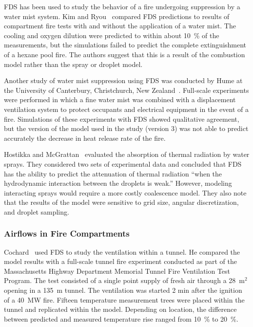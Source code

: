 FDS  has  been  used  to  study  the behavior  of  a  fire  undergoing suppression     by     a    water     mist     system.     Kim     and
Ryou~\cite{Kim:BE2003,Kim:IJACR2004}   compared  FDS   predictions  to results of compartment fire tests  with and without the application of a water
mist. The cooling and oxygen dilution were predicted to within about 10~\% of the measurements, but the simulations failed to predict the complete
extinguishment of a hexane pool fire. The authors suggest that this is a result of the combustion model rather than the spray or droplet model.

Another study  of water  mist suppression using  FDS was  conducted by Hume   at   the    University   of   Canterbury,   Christchurch,   New
Zealand~\cite{Hume:Masters}. Full-scale  experiments were performed in which a fine  water mist was combined with  a displacement ventilation system
to protect occupants and electrical equipment in the event of a fire.  Simulations of  these experiments  with FDS  showed qualitative agreement, but
the version of the  model used in the study (version 3) was not able  to predict accurately the decrease  in heat release rate of the fire.

Hostikka    and   McGrattan~\cite{Hostikka:FSJ2006}    evaluated   the absorption of  thermal radiation by water sprays.  They considered two sets of
experimental data and concluded  that FDS has  the ability to predict the  attenuation of thermal radiation  ``when the hydrodynamic interaction
between   the  droplets  is   weak.''  However,  modeling interacting sprays would require a more costly coalescence model. They also note that  the
results of the model were  sensitive to grid size, angular discretization, and droplet sampling.

\subsubsection{Airflows in Fire Compartments}

Cochard~\cite{Cochard:1} used  FDS to  study the ventilation  within a tunnel. He  compared the model  results with a full-scale  tunnel fire
experiment conducted  as part of the  Massachusetts Highway Department Memorial Tunnel Fire Ventilation  Test Program.  The test consisted of a
single  point supply of  fresh air through  a 28~m$^2$ opening  in a 135~m tunnel.  The ventilation was started 2 min after the ignition of a  40~MW
fire.  Fifteen  temperature  measurement  trees were  placed within  the  tunnel and  replicated  within  the  model. Depending  on location,  the
difference between  predicted and  measured temperature rise ranged from 10~\% to 20~\%.

